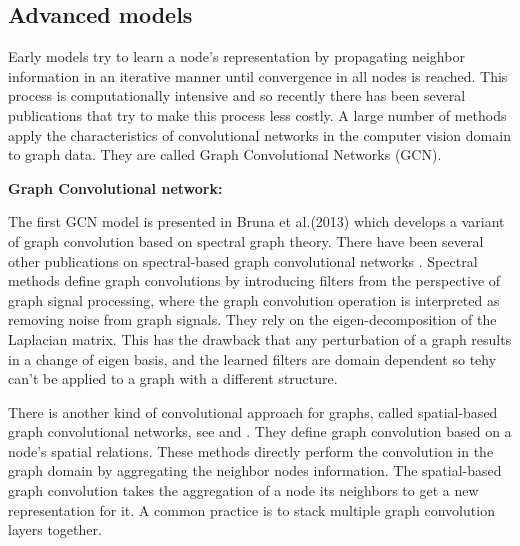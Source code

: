 \subsection{Advanced models} 





Early models try to learn a node's representation by propagating neighbor information in an iterative manner until convergence in all nodes is reached. This process is computationally intensive and so recently there has been several publications that try to make this process less costly. A large number of methods apply the characteristics of convolutional networks in the computer vision domain to graph data. They are called Graph Convolutional Networks (GCN).

\textbf{Graph Convolutional network:}






The first GCN model is presented in Bruna et al.(2013) \cite{bruna} which develops a variant of graph convolution based on spectral graph theory. There have been several other publications on spectral-based graph convolutional networks \cite{deferrard}.  Spectral methods define graph convolutions by introducing filters from the perspective of graph signal processing, where the graph convolution operation is interpreted as removing noise from graph signals. They rely on the eigen-decomposition of the Laplacian matrix. This has the drawback that any perturbation  of a graph results in a change of eigen basis, and the learned filters are domain dependent so tehy can't be applied to a graph with a different structure. 


There is another kind of convolutional approach for graphs, called spatial-based graph convolutional networks, see \cite{graphsage} and \cite{geometricdl}. They define graph convolution based on a node's spatial relations. These methods directly perform the convolution in the graph domain by aggregating the neighbor nodes  information. The spatial-based graph convolution takes the aggregation of a node its neighbors to get a new representation for it. A common practice is to stack multiple graph convolution layers together.


